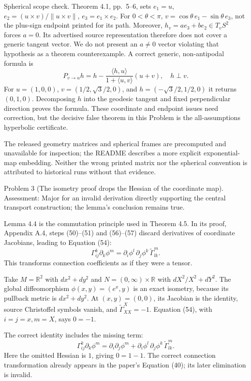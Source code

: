 \documentclass[10pt]{article}
\begin{document}
Spherical scope check. Theorem 4.1, pp. 5–6, sets \(e_1=u\), \(e_2=(u\times v)/\|u\times v\|\), \(e_3=e_1\times e_2\). For \(0<\theta<\pi\), \(v=\cos\theta\,e_1-\sin\theta\,e_3\), not the plus-sign endpoint printed for its path. Moreover, \(h_v=a e_3+b e_2\in T_vS^2\) forces \(a=0\). Its advertised source representation therefore does not cover a generic tangent vector. We do not present an \(a\ne0\) vector violating that hypothesis as a theorem counterexample. A correct generic, non-antipodal formula is \[P_{v\to u}h=h-\frac{\langle h,u\rangle}{1+\langle u,v\rangle}(u+v),
\quad h\perp v.\] For \(u=(1,0,0)\), \(v=(1/2,\sqrt3/2,0)\), and \(h=(-\sqrt3/2,1/2,0)\) it returns \((0,1,0)\). Decomposing \(h\) into the geodesic tangent and fixed perpendicular direction proves the formula. These coordinate and endpoint issues need correction, but the decisive false theorem in this Problem is the all-assumptions hyperbolic certificate.\par
The released geometry matrices and spherical frames are precomputed and unavailable for inspection; the README describes a more explicit exponential-map embedding. Neither the wrong printed matrix nor the spherical convention is attributed to historical runs without that evidence.\par
Problem 3 (The isometry proof drops the Hessian of the coordinate map).  Assessment: Major for an invalid derivation directly supporting the central transport construction; the lemma’s conclusion remains true.\par
Lemma 4.4 is the commutation principle used in Theorem 4.5. In its proof, Appendix A.4, steps (50)–(51) and (56)–(57) discard derivatives of coordinate Jacobians, leading to Equation (54): \[\Gamma^k_{ij}\partial_k\phi^m
=\partial_i\phi^l\,\partial_j\phi^k\,\widetilde\Gamma^m_{lk}.\] This transforms connection coefficients as if they were a tensor.\par
Take \(M=\mathbb R^2\) with \(dx^2+dy^2\) and \(N=(0,\infty)\times\mathbb R\) with \(dX^2/X^2+dY^2\). The global diffeomorphism \(\phi(x,y)=(e^x,y)\) is an exact isometry, because its pullback metric is \(dx^2+dy^2\). At \((x,y)=(0,0)\), its Jacobian is the identity, source Christoffel symbols vanish, and \(\widetilde\Gamma^X_{XX}=-1\). Equation (54), with \(i=j=x,m=X\), says \(0=-1\).\par
The correct identity includes the missing term: \[\Gamma^k_{ij}\partial_k\phi^m
=\partial_i\partial_j\phi^m+
\partial_i\phi^l\,\partial_j\phi^k\,\widetilde\Gamma^m_{lk}.\] Here the omitted Hessian is \(1\), giving \(0=1-1\). The correct connection transformation already appears in the paper’s Equation (40); its later elimination is invalid.\par
\end{document}
